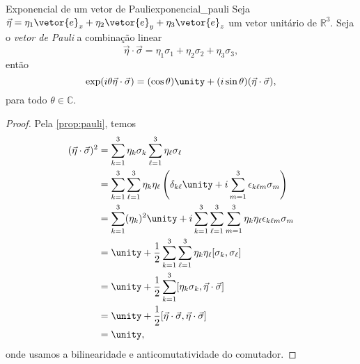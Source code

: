 \begin{proposition}{Exponencial de um vetor de Pauli}{exponencial_pauli}
    Seja \(\vec\eta = \eta_1 \vetor{e}_x + \eta_2\vetor{e}_y + \eta_3 \vetor{e}_z\) um vetor unitário de \(\mathbb{R}^3\). Seja o \emph{vetor de Pauli} a combinação linear
    \begin{equation*}
        \vec\eta \cdot \vec\sigma = \eta_1 \sigma_1 + \eta_2 \sigma_2 + \eta_3 \sigma_3,
    \end{equation*}
    então
    \begin{equation*}
        \exp(i \theta \vec\eta \cdot \vec\sigma) = (\cos\theta)\unity + (i\sin\theta)(\vec\eta \cdot\vec\sigma),
    \end{equation*}
    para todo \(\theta\in \mathbb{C}.\)
\end{proposition}
\begin{proof}
    Pela \cref{prop:pauli}, temos
    \begin{align*}
        (\vec \eta \cdot \vec \sigma)^2 &= \sum_{k=1}^3 \eta_k \sigma_k \sum_{\ell = 1}^3 \eta_\ell \sigma_\ell\\
                                        &= \sum_{k=1}^3\sum_{\ell=1}^3 \eta_k \eta_\ell \left(\delta_{k\ell}\unity + i \sum_{m = 1}^3 \epsilon_{k\ell m}\sigma_m\right)\\
                                        &= \sum_{k=1}^3 (\eta_k)^2 \unity + i\sum_{k=1}^3\sum_{\ell=1}^3 \sum_{m = 1}^3 \eta_k \eta_\ell\epsilon_{k\ell m}\sigma_m\\
                                        &= \unity + \frac12 \sum_{k=1}^3\sum_{\ell=1}^3 \eta_k \eta_\ell [\sigma_k, \sigma_\ell]\\
                                        &= \unity + \frac12 \sum_{k=1}^3 [\eta_k \sigma_k, \vec \eta \cdot \vec \sigma]\\
                                        &= \unity + \frac12 [\vec \eta\cdot \vec \sigma, \vec \eta\cdot \vec \sigma]\\
                                        &= \unity,
    \end{align*}
    onde usamos a bilinearidade e anticomutatividade do comutador.


\end{proof}
